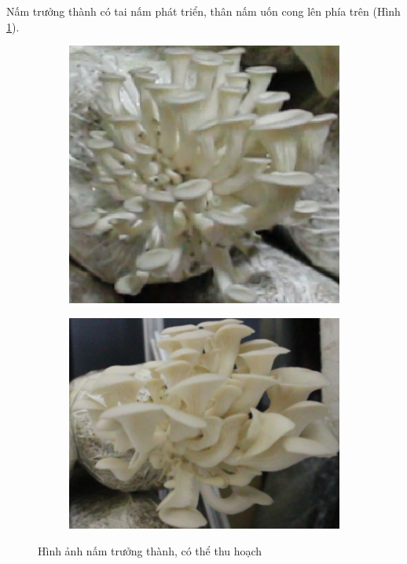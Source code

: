 Nấm trưởng thành có tai nấm phát triển, thân nấm uốn cong lên phía trên (Hình \ref{fig:ready}).

\begin{figure}[H]
    \centering
        \begin{subfigure}{.5\textwidth}
        \includegraphics[width=0.8\linewidth]{images/ready1.png}
    \end{subfigure}%
    \begin{subfigure}{.5\textwidth}
        \includegraphics[width=0.8\linewidth]{images/ready3.png}
    \end{subfigure}
    \caption{Hình ảnh nấm trưởng thành, có thể thu hoạch}
    \label{fig:ready}
\end{figure}

